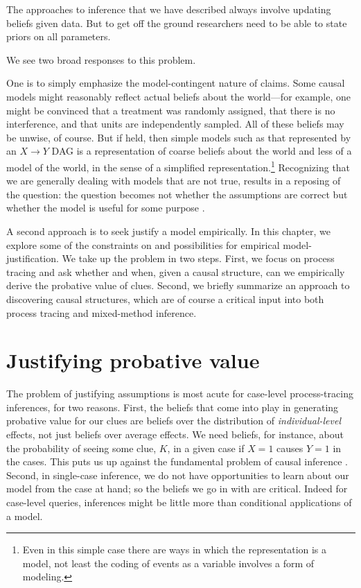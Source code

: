 \documentclass[
  12pt,
]{book}
\begin{document}
The approaches to inference that we have described always involve updating beliefs given data. But to get off the ground researchers need to be able to state priors on all parameters.

We see two broad responses to this problem.

One is to simply emphasize the model-contingent nature of claims. Some causal models might reasonably reflect actual beliefs about the world---for example, one might be convinced that a treatment was randomly assigned, that there is no interference, and that units are independently sampled. All of these beliefs may be unwise, of course. But if held, then simple models such as that represented by an \(X \rightarrow Y\) DAG is a representation of coarse beliefs about the world and less of a model of the world, in the sense of a simplified representation.\footnote{Even in this simple case there are ways in which the representation is a model, not least the coding of events as a variable involves a form of modeling.} Recognizing that we are generally dealing with models that are not true, results in a reposing of the question: the question becomes not whether the assumptions are correct but whether the model is useful for some purpose \citep{clarke2012model}.

A second approach is to seek justify a model empirically. In this chapter, we explore some of the constraints on and possibilities for empirical model-justification. We take up the problem in two steps. First, we focus on process tracing and ask whether and when, given a causal structure, can we empirically derive the probative value of clues. Second, we briefly summarize an approach to discovering causal structures, which are of course a critical input into both process tracing and mixed-method inference.

\hypertarget{justifying-probative-value}{%
\section{Justifying probative value}\label{justifying-probative-value}}

The problem of justifying assumptions is most acute for case-level process-tracing inferences, for two reasons. First, the beliefs that come into play in generating probative value for our clues are beliefs over the distribution of \emph{individual-level} effects, not just beliefs over average effects. We need beliefs, for instance, about the probability of seeing some clue, \(K\), in a given case if \(X=1\) causes \(Y=1\) in the cases. This puts us up against the fundamental problem of causal inference \citep{holland1986statistics}. Second, in single-case inference, we do not have opportunities to learn about our model from the case at hand; so the beliefs we go in with are critical. Indeed for case-level queries, inferences might be little more than conditional applications of a model.
\end{document}
